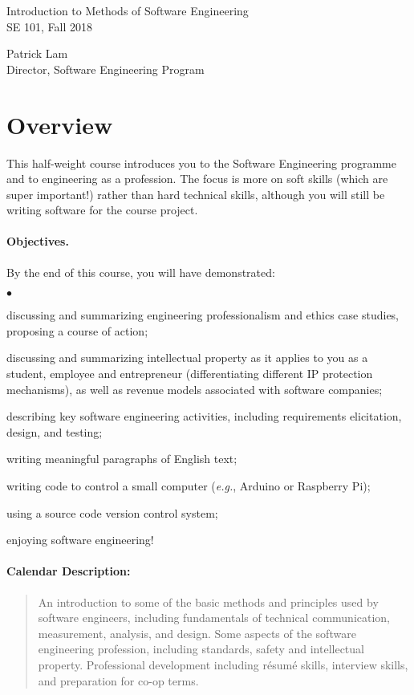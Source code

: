 \documentclass[11pt,onecolumn]{article}
\newcommand{\eg}{\emph{e.g.}\xspace}
\newcommand{\squishlist}{
 \begin{list}{$\bullet$}
  { \setlength{\itemsep}{0pt}
     \setlength{\parsep}{3pt}
     \setlength{\topsep}{3pt}
     \setlength{\partopsep}{0pt}
     \setlength{\leftmargin}{1.5em}
     \setlength{\labelwidth}{1em}
     \setlength{\labelsep}{0.5em} } }
\newcommand{\squishend}{
  \end{list}  }
\begin{document}
\pagestyle{empty}

\renewcommand{\arraystretch}{0.92}

\begin{center}
\begin{Large}
Introduction to Methods of Software Engineering\\
SE 101, Fall 2018\\[1em]
\end{Large}

\begin{large}
Patrick Lam \\
Director, Software Engineering Program\\
\end{large}
\end{center}

\section{Overview}
This half-weight course introduces you to the Software Engineering programme and to engineering as a profession. The focus is more on soft skills (which are super important!) rather than hard technical skills, although you will still be writing software for the course project.

\paragraph{Objectives.}
By the end of this course, you will have demonstrated:
\squishlist
\item discussing and summarizing engineering professionalism and ethics case studies, proposing a course of action;
\item discussing and summarizing intellectual property as it applies to you as a student, employee and entrepreneur (differentiating different IP protection mechanisms), as well as revenue models associated with software companies; 
\item describing key software engineering activities, including requirements elicitation, design, and testing;
\item writing meaningful paragraphs of English text;
\item writing code to control a small computer (\eg, Arduino or
Raspberry Pi);
\item using a source code version control system; 
\item enjoying software engineering!
\squishend

\paragraph{Calendar Description:}
\begin{quote}
    An introduction to some of the basic methods and principles used by software engineers, including fundamentals of technical communication, measurement, analysis, and design. Some aspects of the software engineering profession, including standards, safety and intellectual property. Professional development including r\'esum\'e skills, interview skills, and preparation for co-op terms.
\end{quote}
\end{document}
